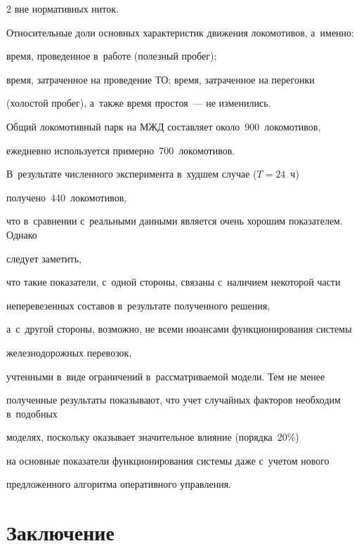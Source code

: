 \begin{multicols}{2}
вне нормативных ниток.


Относительные доли основных характеристик движения локомотивов, а~именно: 


время, проведенное в~работе (полезный пробег);


время, затраченное на проведение ТО; время, затраченное на перегонки 


(холостой пробег), а~также время простоя~--- не изменились.





Общий локомотивный парк на МЖД составляет около~900~локомотивов, 


ежедневно используется примерно~700~локомотивов.


В~результате численного эксперимента в~худшем случае ($T = 24$~ч) 


получено~440~локомотивов,


что в~сравнении с~реальными данными является очень хорошим показателем. Однако 


следует заметить,


что такие показатели, с~одной стороны, связаны с~наличием некоторой части 


неперевезенных составов в~результате полученного решения,


а~с~другой стороны, возможно, не всеми нюансами функционирования системы


 железнодорожных перевозок,


учтенными в~виде ограничений в~рассматриваемой модели. Тем не менее 


полученные результаты показывают, что учет случайных факторов необходим в~подобных 


моделях, поскольку оказывает значительное влияние (порядка~20\%) 


на основные показатели функционирования системы даже с~учетом нового 


предложенного алгоритма оперативного управления.





\vspace*{-6pt}





\section{Заключение}






\end{multicols}
